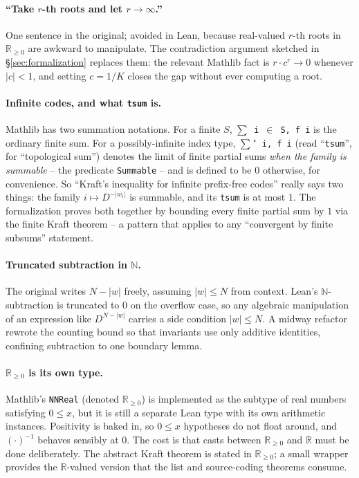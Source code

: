 \documentclass[11pt]{article}
\begin{document}
\paragraph{``Take $r$-th roots and let $r \to \infty$.''} One sentence in
the original; avoided in Lean, because real-valued $r$-th roots in
$\mathbb{R}_{\ge 0}$ are awkward to manipulate. The contradiction
argument sketched in \S\ref{sec:formalization} replaces them: the
relevant \textsf{Mathlib} fact is $r \cdot c^r \to 0$ whenever $|c| < 1$,
and setting $c = 1/K$ closes the gap without ever computing a root.

\paragraph{Infinite codes, and what \texttt{tsum} is.} \textsf{Mathlib}
has two summation notations. For a finite $S$, \texttt{$\sum$ i $\in$ S, f i}
is the ordinary finite sum. For a possibly-infinite index type,
\texttt{$\sum$' i, f i} (read ``\texttt{tsum}'', for ``topological sum'')
denotes the limit of finite partial sums \emph{when the family is
summable} -- the predicate \texttt{Summable} -- and is defined to be $0$
otherwise, for convenience. So ``Kraft's inequality for infinite
prefix-free codes'' really says two things: the family $i \mapsto
D^{-|w_i|}$ is summable, and its \texttt{tsum} is at most $1$. The
formalization proves both together by bounding every finite partial sum
by $1$ via the finite Kraft theorem -- a pattern that applies to any
``convergent by finite subsums'' statement.

\paragraph{Truncated subtraction in $\mathbb{N}$.} The original writes
$N - |w|$ freely, assuming $|w| \le N$ from context. Lean's
$\mathbb{N}$-subtraction is truncated to $0$ on the overflow case, so any
algebraic manipulation of an expression like $D^{N-|w|}$ carries a side
condition $|w| \le N$. A midway refactor rewrote the counting bound so
that invariants use only additive identities, confining subtraction to
one boundary lemma.

\paragraph{$\mathbb{R}_{\ge 0}$ is its own type.} \textsf{Mathlib}'s
\texttt{NNReal} (denoted $\mathbb{R}_{\ge 0}$) is implemented as the
subtype of real numbers satisfying $0 \le x$, but it is still a separate
Lean type with its own arithmetic instances. Positivity is baked in, so
$0 \le x$ hypotheses do not float around, and $(\cdot)^{-1}$ behaves
sensibly at $0$. The cost is that casts between $\mathbb{R}_{\ge 0}$ and
$\mathbb{R}$ must be done deliberately. The abstract Kraft theorem is
stated in $\mathbb{R}_{\ge 0}$; a small wrapper provides the
$\mathbb{R}$-valued version that the list and source-coding theorems
consume.
\end{document}
